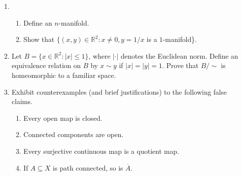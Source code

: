\documentclass[12pt]{article}
\def\Reals{{\mathbb R}}
\begin{document}
\begin{enumerate}
\item 
\begin{enumerate}
\item Define an $n$-manifold.
\item Show that $\{(x,y)\in\Reals^2:x\neq 0,y=1/x$ is a $1$-manifold\}.
\end{enumerate}

\item Let $B=\{x\in\Reals^2:|x|\le 1\}$, where $|\cdot|$ denotes the
Euclidean norm.  Define an
equivalence relation on $B$ by $x\sim y$ if $|x|=|y|=1$. Prove
that $B/\sim$ is homeomorphic to a familiar space.

\item Exhibit counterexamples (and brief justifications) 
to the following false claims.
\begin{enumerate}
\item Every open map is closed.
\item Connected components are open.
\item Every surjective continuous map is a quotient map.
\item If $A\subseteq X$ is path connected, so is $\overline A$.
\end{enumerate}

\end{enumerate}
\end{document}
